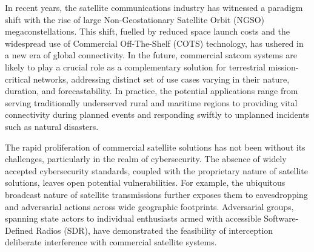 \documentclass[english, 12pt, a4paper, elec, utf8, a-1b, online]{aaltothesis}
\date{31.12.2023}
\begin{document}
\makecoverpage

\makecopyrightpage


\begin{abstractpage}[english]
  In recent years, the satellite communications industry has witnessed a paradigm shift with the rise of large Non-Geostationary Satellite Orbit (NGSO) megaconstellations. This shift, fuelled by reduced space launch costs and the widespread use of Commercial Off-The-Shelf (COTS) technology, has ushered in a new era of global connectivity. In the future, commercial satcom systems are likely to play a crucial role as a complementary solution for terrestrial mission-critical networks, addressing distinct set of use cases varying in their nature, duration, and forecastability. In practice, the potential applications range from serving traditionally underserved rural and maritime regions to providing vital connectivity during planned events and responding swiftly to unplanned incidents such as natural disasters.

  The rapid proliferation of commercial satellite solutions has not been without its challenges, particularly in the realm of cybersecurity. The absence of widely accepted cybersecurity standards, coupled with the proprietary nature of satellite solutions, leaves open potential vulnerabilities. For example, the ubiquitous broadcast nature of satellite transmissions further exposes them to eavesdropping and adversarial actions across wide geographic footprints. Adversarial groups, spanning state actors to individual enthusiasts armed with accessible Software-Defined Radios (SDR), have demonstrated the feasibility of interception deliberate interference with commercial satellite systems.


\end{abstractpage}
\end{document}
